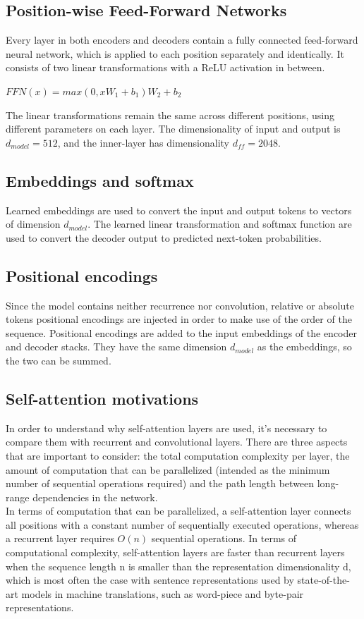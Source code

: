 \documentclass[\main/main.tex]{subfiles}
\begin{document}
\subsection{Position-wise Feed-Forward Networks}
Every layer in both encoders and decoders contain a fully connected feed-forward neural network, which is applied to each position separately and identically.
It consists of two linear transformations with a ReLU activation in between.
\begin{center}
    $FFN(x) = max(0, xW_1 + b_1)W_2 + b_2$
\end{center}
The linear transformations remain the same across different positions, using different parameters on each layer. The dimensionality of input and output is $d_{model} = 512$, and the inner-layer has dimensionality $d_{ff} = 2048$.

\subsection{Embeddings and softmax}
Learned embeddings are used to convert the input and output tokens to vectors of dimension $d_{model}$. The learned linear transformation and softmax function are used to convert the decoder output to predicted next-token probabilities.

\subsection{Positional encodings}
Since the model contains neither recurrence nor convolution, relative or absolute tokens positional encodings are injected in order to make use of the order of the sequence. Positional encodings are added to the input embeddings of the encoder and decoder stacks. They have the same dimension $d_{model}$ as the embeddings, so the two can be summed.

\subsection{Self-attention motivations}
In order to understand why self-attention layers are used, it's necessary to compare them with recurrent and convolutional layers. There are three aspects that are important to consider: the total computation complexity per layer, the amount of computation that can be parallelized (intended as the minimum number of sequential operations required) and the path length between long-range dependencies in the network. \\
In terms of computation that can be parallelized, a self-attention layer connects all positions with a constant number of sequentially executed operations, whereas a recurrent layer requires $O(n)$ sequential operations. In terms of computational complexity, self-attention layers are faster than recurrent layers when the sequence length n is smaller than the representation dimensionality d, which is most often the case with sentence representations used by state-of-the-art models in machine translations, such as word-piece and byte-pair representations.
\end{document}
